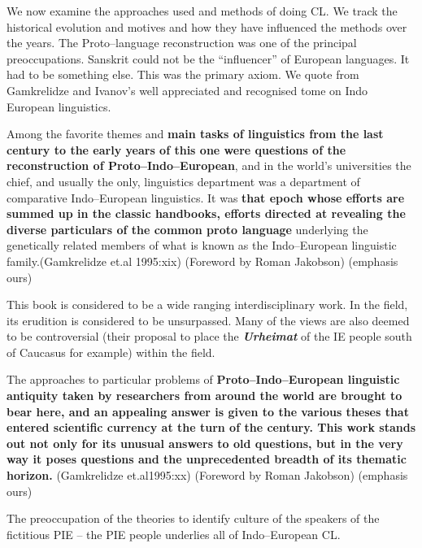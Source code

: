 We now examine the approaches used and methods of doing CL. We track the historical evolution and motives and how they have influenced the methods over the years. The Proto–language reconstruction was one of the principal preoccupations. Sanskrit could not be the “influencer” of European languages. It had to be something else. This was the primary axiom. We quote from Gamkrelidze and Ivanov’s well appreciated and recognised tome on Indo European linguistics.

\begin{myquote}
Among the favorite themes and \textbf{main tasks of linguistics from the last century to the early years of this one were questions of the reconstruction of Proto–Indo–European}, and in the world's universities the chief, and usually the only, linguistics department was a department of comparative Indo–European linguistics. It was \textbf{that epoch whose efforts are summed up in the classic handbooks, efforts directed at revealing the diverse particulars of the common proto language} underlying the genetically related members of what is known as the Indo–European linguistic family.(Gamkrelidze et.al 1995:xix) (Foreword by Roman Jakobson) (emphasis ours)
\end{myquote}

This book is considered to be a wide ranging interdisciplinary work. In the field, its erudition is considered to be unsurpassed. Many of the views are also deemed to be controversial (their proposal to place the \textbf{\textit{Urheimat}} of the IE people south of Caucasus for example) within the field.

\begin{myquote}
The approaches to particular problems of \textbf{Proto–Indo–European linguistic antiquity taken by researchers from around the world are brought to bear here, and an appealing answer is given to the various theses that entered scientific currency at the turn of the century. This work stands out not only for its unusual answers to old questions, but in the very way it poses questions and the unprecedented breadth of its thematic horizon.} (Gamkrelidze et.al1995:xx) (Foreword by Roman Jakobson) (emphasis ours)
\end{myquote}

The preoccupation of the theories to identify culture of the speakers of the fictitious PIE – the PIE people underlies all of Indo–European CL.

